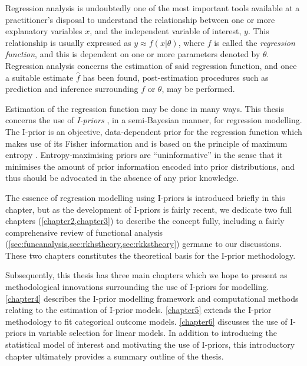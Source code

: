 \documentclass[11pt,twoside,openright,showframe]{report}
\begin{document}
\label{chapter1}
\thispagestyle{chapterone}

Regression analysis is undoubtedly one of the most important tools available at a practitioner's disposal to understand the relationship between one or more explanatory variables $x$, and the independent variable of interest, $y$.
This relationship is usually expressed as $y \approx f(x|\theta)$, where $f$ is called the \emph{regression function}, and this is   dependent on one or more parameters denoted by $\theta$.
Regression analysis concerns the estimation of said regression function, and once a suitable estimate $\hat f$ has been found, post-estimation procedures such as prediction and inference surrounding $f$ or $\theta$, may be performed.

Estimation of the regression function may be done in many ways.
This thesis concerns the use of \emph{I-priors} \citep{bergsma2017}, in a semi-Bayesian manner, for regression modelling.
The I-prior is an objective, data-dependent prior for the regression function which makes use of its Fisher information and is based on the principle of maximum entropy \citep{jaynes1957a,jaynes1957b,jaynes2003probability}.
Entropy-maximising priors are ``uninformative'' in the sense that it minimises the amount of prior information encoded into prior distributions, and thus should be advocated in the absence of any prior knowledge.
\label{errata1}

The essence of regression modelling using I-priors is introduced briefly in this chapter, but as the development of I-priors is fairly recent, we dedicate two full chapters (\cref{chapter2,chapter3}) to describe the concept fully, including a fairly comprehensive review of functional analysis (\cref{sec:funcanalysis,sec:rkhstheory,sec:rkkstheory}) germane to our discussions.
These two chapters constitutes the theoretical basis for the I-prior methodology.

Subsequently, this thesis has three main chapters which we hope to present as methodological innovations surrounding the use of I-priors for  modelling.
\cref{chapter4} describes the I-prior modelling framework and computational methods relating to the estimation of I-prior models.
\cref{chapter5} extends the I-prior methodology to fit categorical outcome models.
\cref{chapter6} discusses the use of I-priors in variable selection for linear models. 
In addition to introducing the statistical model of interest and  motivating the use of I-priors, this introductory chapter ultimately provides a summary outline of the thesis.
\end{document}
